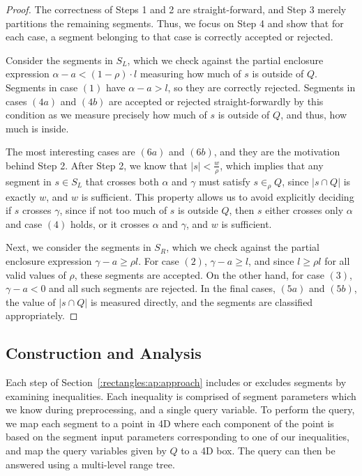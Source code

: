 \begin{proof}
The correctness of Steps 1 and 2 are straight-forward, and Step 3 merely partitions the remaining segments. Thus, we focus on Step 4 and show that for each case, a segment belonging to that case is correctly accepted or rejected.

Consider the segments in $S_L$, which we check against the partial enclosure expression $\alpha - a < (1 - \rho) \cdot l$ measuring how much of $s$ is outside of $Q$. 
Segments in case $(1)$ have $\alpha - a > l$, so they are correctly rejected. 
Segments in cases $(4a)$ and $(4b)$ are accepted or rejected straight-forwardly by this condition as we measure precisely how much of $s$ is outside of $Q$, and thus, how much is inside. 

The most interesting cases are $(6a)$ and $(6b)$, and they are the motivation behind Step 2.  After Step 2, we know that $|s| < \frac{w}{\rho}$, which implies that any segment in $s \in S_L$ that crosses both $\alpha$ and $\gamma$ must satisfy $s \in_\rho Q$, since $|s \cap Q|$ is exactly $w$, and $w$ is sufficient. This property allows us to avoid explicitly deciding if $s$ crosses $\gamma$, since if not too much of $s$ is outside $Q$, then $s$ either crosses only $\alpha$ and case $(4)$ holds, or it crosses $\alpha$ and $\gamma$, and $w$ is sufficient.

Next, we consider the segments in $S_R$, which we check against the partial enclosure expression $\gamma - a \geq  \rho l$. 
For case $(2)$, $\gamma - a \geq l$, and since $l \geq \rho l$ for all valid values of $\rho$, these segments are accepted.
On the other hand, for case $(3)$, $\gamma - a < 0$ and all such segments are rejected. 
In the final cases, $(5a)$ and $(5b)$, the value of $|s \cap Q|$ is measured directly, and the segments are classified appropriately.

\end{proof}


\subsection{Construction and Analysis}
\label{:rectangles:ap:analysis}

Each step of Section~\ref{:rectangles:ap:approach} includes or excludes segments by examining inequalities.
Each inequality is comprised of segment parameters which we know during preprocessing, and a single query variable. 
To perform the query, we map each segment to a point in 4D where each component of the point is based on the segment input parameters corresponding to one of our inequalities, and map the query variables given by $Q$ to a 4D box.
The query can then be answered using a multi-level range tree.

